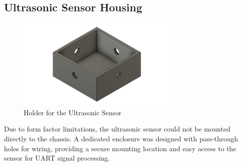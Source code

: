 \subsection*{Ultrasonic Sensor Housing}
\begin{figure}[H]
  \centering
  \includegraphics[width=0.7\textwidth]{subpages/images/ultrasonic_mount.png}
  \caption{Holder for the Ultrasonic Sensor}
  \label{fig:ultrasonic_mount}
\end{figure}
Due to form factor limitations, the ultrasonic sensor could not be mounted directly to the chassis. A dedicated enclosure was designed with pass-through holes for wiring, providing a secure mounting location and easy access to the sensor for UART signal processing.
